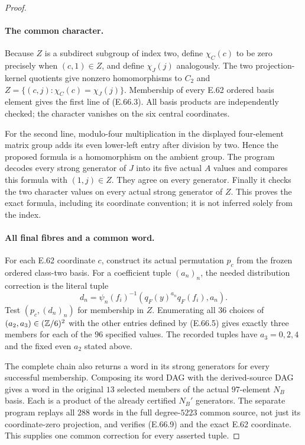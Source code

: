 \begin{proof}
\paragraph{The common character.}
Because $Z$ is a subdirect subgroup of index two, define
$\chi_C(c)$ to be zero precisely when $(c,1)\in Z$, and define
$\chi_J(j)$ analogously. The two projection-kernel quotients
give nonzero homomorphisms to $C_2$ and
$Z=\{(c,j):\chi_C(c)=\chi_J(j)\}$. Membership of every E.62
ordered basis element gives the first line of
\textup{(E.66.3)}. All basis products are independently checked;
the character vanishes on the six central coordinates.

For the second line, modulo-four multiplication in the displayed
four-element matrix group adds its even lower-left entry after
division by two. Hence the proposed formula is a homomorphism
on the ambient group. The program decodes every strong generator
of $J$ into its five actual $A$ values and compares this formula
with $(1,j)\in Z$. They agree on every generator. Finally it
checks the two character values on every actual strong generator
of $Z$. This proves the exact formula, including its coordinate
convention; it is not inferred solely from the index.

\paragraph{All final fibres and a common word.}
For each E.62 coordinate $c$, construct its actual permutation
$p_c$ from the frozen ordered class-two basis. For a coefficient
tuple $(a_n)_n$, the needed distribution correction is the literal
tuple
\[
 d_n=\psi_n(f_i)^{-1}(q_F(y)^{a_n}q_F(f_i),a_n).
 \tag{E.66.9}
\]
Test $(p_c,(d_n)_n)$ for membership in $Z$. Enumerating all
$36$ choices of $(a_2,a_3)\in(\mathbb Z/6)^2$ with the other entries
defined by \textup{(E.66.5)} gives exactly three members for
each of the $96$ specified values. The recorded tuples have
$a_3=0,2,4$ and the fixed even $a_2$ stated above.

The complete chain also returns a word in its strong generators
for every successful membership. Composing its word DAG with the
derived-source DAG gives a word in the original $13$ selected
members of the actual $97$-element $N_B$ basis. Each is a product
of the already certified $N_B'$ generators. The separate program
replays all $288$ words in the full degree-$5223$ common source,
not just its coordinate-zero projection, and verifies
\textup{(E.66.9)} and the exact E.62 coordinate. This supplies
one common correction for every asserted tuple.


\end{proof}
